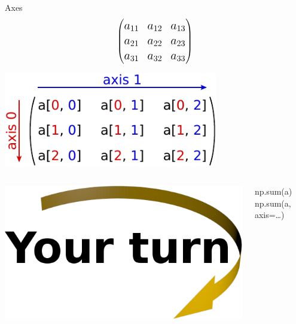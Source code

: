 \documentclass[svgnames]{beamer}
\begin{document}
\begin{frame}{Axes}
 \begin{displaymath}
  \begin{Large}
  \begin{pmatrix}
   a_{11} & a_{12} & a_{13} \\
   a_{21} & a_{22} & a_{23} \\
   a_{31} & a_{32} & a_{33} \\
  \end{pmatrix}
  \end{Large}
 \end{displaymath}

 \vspace{0.2truecm}
 \begin{center}
  \includegraphics[width=0.7\textwidth]{axes}
 \end{center}

 \vspace{0.2truecm}
 \begin{columns}
  \begin{column}{0.4\textwidth}
   \begin{center}
    \includegraphics[width=3truecm]{yourturn}
   \end{center}
  \end{column}%
  \begin{column}{0.6\textwidth}
   np.sum(a)\\
   np.sum(a, axis=\ldots)
  \end{column}
 \end{columns}
\end{frame}
\end{document}
